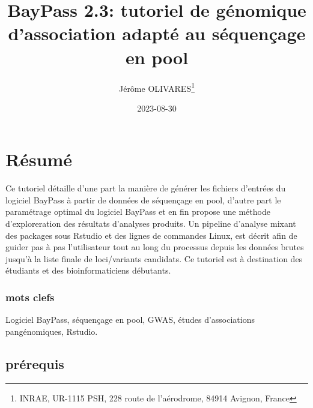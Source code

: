 \documentclass[
  openany]{book}
\title{BayPass 2.3: tutoriel de génomique d'association adapté au séquençage en pool}
\author{Jérôme OLIVARES\footnote{INRAE, UR-1115 PSH, 228 route de l'aérodrome, 84914 Avignon, France}}
\date{2023-08-30}
\theoremstyle{definition}
\theoremstyle{definition}
\theoremstyle{definition}
\theoremstyle{definition}
\theoremstyle{remark}
\begin{document}
\maketitle

{
\hypersetup{linkcolor=}
\setcounter{tocdepth}{1}
\tableofcontents
}
\hypertarget{ruxe9sumuxe9}{%
\chapter*{Résumé}\label{ruxe9sumuxe9}}

Ce tutoriel détaille d'une part la manière de générer les fichiers d'entrées du logiciel BayPass à partir de données de séquençage en pool, d'autre part le paramétrage optimal du logiciel BayPass et en fin propose une méthode d'exploreration des résultats d'analyses produits. Un pipeline d'analyse mixant des packages sous Rstudio et des lignes de commandes Linux, est décrit afin de guider pas à pas l'utilisateur tout au long du processus depuis les données brutes jusqu'à la liste finale de loci/variants candidats.
Ce tutoriel est à destination des étudiants et des bioinformaticiens débutants.

\hypertarget{mots-clefs}{%
\subsection*{mots clefs}\label{mots-clefs}}

Logiciel BayPass, séquençage en pool, GWAS, études d'associations pangénomiques, Rstudio.

\hypertarget{pruxe9requis}{%
\section*{prérequis}\label{pruxe9requis}}
\end{document}
